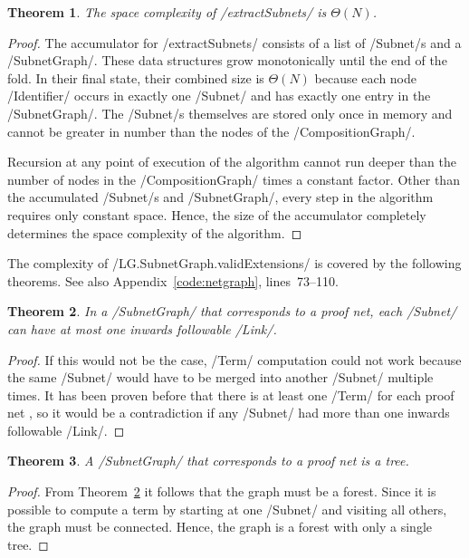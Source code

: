\documentclass[12pt,a4paper]{article}
\newtheorem{theorem}{Theorem}
\begin{document}
\begin{theorem}\label{thm:netgraph-space}
    The space complexity of \hs/extractSubnets/ is $\Theta(N)$.
\end{theorem}
\begin{proof}
    The accumulator for \hs/extractSubnets/ consists of a list of \hs/Subnet/s and a \hs/SubnetGraph/. These data structures grow monotonically until the end of the fold. In their final state, their combined size is $\Theta(N)$ because each node \hs/Identifier/ occurs in exactly one \hs/Subnet/ and has exactly one entry in the \hs/SubnetGraph/. The \hs/Subnet/s themselves are stored only once in memory and cannot be greater in number than the nodes of the \hs/CompositionGraph/.
    
    Recursion at any point of execution of the algorithm cannot run deeper than the number of nodes in the \hs/CompositionGraph/ times a constant factor. Other than the accumulated \hs/Subnet/s and \hs/SubnetGraph/, every step in the algorithm requires only constant space. Hence, the size of the accumulator completely determines the space complexity of the algorithm.
\end{proof}

The complexity of \hs/LG.SubnetGraph.validExtensions/ is covered by the following theorems. See also Appendix~\ref{code:netgraph}, lines~73--110.
\begin{theorem}\label{thm:inwards-links}
    In a \hs/SubnetGraph/ that corresponds to a proof net, each \hs/Subnet/ can have at most one inwards followable \hs/Link/.
\end{theorem}
\begin{proof}
    If this would not be the case, \hs/Term/ computation could not work because the same \hs/Subnet/ would have to be merged into another \hs/Subnet/ multiple times. It has been proven before that there is at least one \hs/Term/ for each proof net \cite[p.~11]{mm12}, so it would be a contradiction if any \hs/Subnet/ had more than one inwards followable \hs/Link/.
\end{proof}

\begin{theorem}\label{thm:tree}
    A \hs/SubnetGraph/ that corresponds to a proof net is a tree.
\end{theorem}
\begin{proof}
    From Theorem~\ref{thm:inwards-links} it follows that the graph must be a forest. Since it is possible to compute a term by starting at one \hs/Subnet/ and visiting all others, the graph must be connected. Hence, the graph is a forest with only a single tree.
\end{proof}
\end{document}
